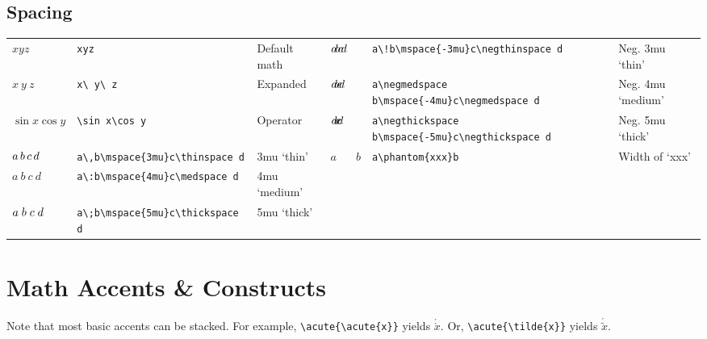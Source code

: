 \documentclass[10pt, english]{article}
\begin{document}
	\subsection{Spacing}

	\begin{center}
		\scriptsize
	\begin{tabular}{lll|lll}
		$xyz$ & \verb|xyz| & Default math & $a\!b\mspace{-3mu}c\negthinspace d$ & \verb|a\!b\mspace{-3mu}c\negthinspace d| & Neg. 3mu `thin' \\
		$x\ y\ z$ & \verb|x\ y\ z| & Expanded & $a\negmedspace b\mspace{-4mu}c\negmedspace d$ & \verb|a\negmedspace b\mspace{-4mu}c\negmedspace d| & Neg. 4mu `medium' \\
		$\sin x\cos y$ & \verb|\sin x\cos y| & Operator & $a\negthickspace b\mspace{-5mu}c\negthickspace d$ & \verb|a\negthickspace b\mspace{-5mu}c\negthickspace d| & Neg. 5mu `thick' \\
		$a\,b\mspace{3mu}c\thinspace d$ & \verb|a\,b\mspace{3mu}c\thinspace d| & 3mu `thin' & $a\phantom{xxx}b$ & \verb|a\phantom{xxx}b| & Width of `xxx' \\
		$a\:b\mspace{4mu}c\medspace d$ & \verb|a\:b\mspace{4mu}c\medspace d| & 4mu `medium' \\
		$a\;b\mspace{5mu}c\thickspace d$ & \verb|a\;b\mspace{5mu}c\thickspace d| & 5mu `thick' \\
	\end{tabular}
	\end{center}

\section{Math Accents \& Constructs}

	Note that most basic accents can be stacked. For example, \verb|\acute{\acute{x}}| yields $\acute{\acute{x}}$. Or, \verb|\acute{\tilde{x}}| yields $\acute{\tilde{x}}$.
\end{document}
